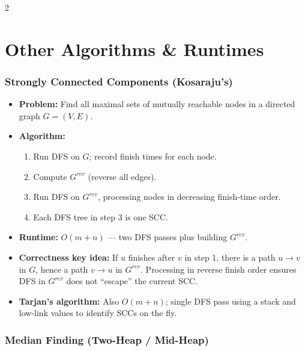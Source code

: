 \documentclass[9pt]{article}
\begin{document}
\begin{multicols}{2}
\section*{Other Algorithms \& Runtimes}

\subsubsection*{Strongly Connected Components (Kosaraju's)}

\begin{itemize}
  \item \textbf{Problem:} Find all maximal sets of mutually reachable nodes in a directed graph $G=(V,E)$.
  \item \textbf{Algorithm:}
  \begin{enumerate}
    \item Run DFS on $G$; record finish times for each node.
    \item Compute $G^{rev}$ (reverse all edges).
    \item Run DFS on $G^{rev}$, processing nodes in decreasing finish-time order.
    \item Each DFS tree in step 3 is one SCC.
  \end{enumerate}
  \item \textbf{Runtime:} $O(m+n)$ — two DFS passes plus building $G^{rev}$.
  \item \textbf{Correctness key idea:} If $u$ finishes after $v$ in step 1, there is a path $u\to v$ in $G$, hence a path $v\to u$ in $G^{rev}$. Processing in reverse finish order ensures DFS in $G^{rev}$ does not ``escape'' the current SCC.
  \item \textbf{Tarjan's algorithm:} Also $O(m+n)$; single DFS pass using a stack and low-link values to identify SCCs on the fly.
\end{itemize}

\subsubsection*{Median Finding (Two-Heap / Mid-Heap)}


\end{multicols}
\end{document}
